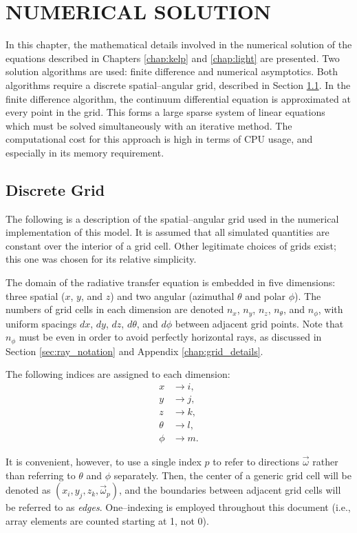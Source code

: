 \chapter{NUMERICAL SOLUTION}
\label{chap:numerical}
In this chapter, the mathematical details involved in the numerical solution of the equations described in Chapters \ref{chap:kelp} and \ref{chap:light} are presented.
Two solution algorithms are used: finite difference and numerical asymptotics.
Both algorithms require a discrete spatial--angular grid, described in Section \ref{sec:grid}.
In the finite difference algorithm, the continuum differential equation is approximated at every point in the grid.
This forms a large sparse system of linear equations which must be solved simultaneously with an iterative method.
The computational cost for this approach is high in terms of CPU usage, and especially in its memory requirement.

\section{Discrete Grid}
\label{sec:grid}

The following is a description of the spatial--angular grid used in the numerical implementation of this model.
It is assumed that all simulated quantities are constant over the interior of a grid cell.
Other legitimate choices of grids exist; this one was chosen for its relative simplicity.

The domain of the radiative transfer equation is embedded in five dimensions: three spatial ($x$, $y$, and $z$) and two angular (azimuthal $\theta$ and polar $\phi$).
The numbers of grid cells in each dimension are denoted $n_x$, $n_y$, $n_z$,
$n_\theta$, and $n_\phi$, with uniform spacings $dx$, $dy$, $dz$, $d\theta$, and
$d\phi$ between adjacent grid points.
Note that $n_\phi$ must be even in order to avoid perfectly horizontal rays, as discussed in Section \ref{sec:ray_notation} and Appendix \ref{chap:grid_details}.

The following indices are assigned to each dimension:
\begin{align*}
  x &\to i, \\
  y &\to j, \\
  z &\to k, \\
  \theta &\to l, \\
  \phi &\to m.
\end{align*}

It is convenient, however, to use a single index $p$ to refer to directions $\vec{\omega}$ rather than referring to $\theta$ and $\phi$ separately.
Then, the center of a generic grid cell will be denoted as
$(x_i, y_j, z_k, \vec{\omega}_p)$, and the boundaries between adjacent grid cells
will be referred to as \textit{edges}.
One--indexing is employed throughout this document (i.e., array elements are counted starting at 1, not 0).


